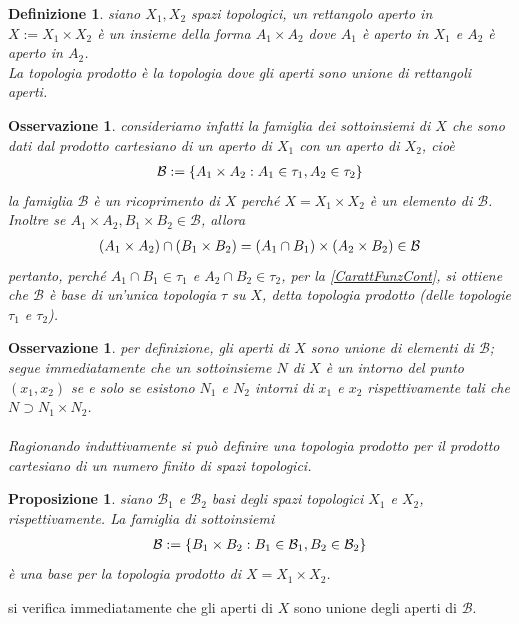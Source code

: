 \documentclass[oneside, 11pt]{amsbook}
\makeatletter
\newcommand{\0}{{(0)}}
\newcommand{\3}{{(3)}}
\theoremstyle{colonplain}
\newtheorem{prop}[thm]{Proposizione}
\theoremstyle{colondefinition}
\newtheorem{defn}[thm]{Definizione}
\theoremstyle{colonremark}
\newtheorem{rmk}[thm]{Osservazione}
\numberwithin{equation}{chapter}
\renewcommand{\proofname}{Dimostrazione}
\renewenvironment{proof}[1][\proofname]{\par
  \pushQED{\qed}%
  \normalfont \topsep6\p@\@plus6\p@\relax
  \trivlist
  \item[\hskip\labelsep\bfseries #1:]\ignorespaces
}{%
  \popQED\endtrivlist\@endpefalse
}
\makeatother
\begin{document}
\begin{defn}
siano $X_1, X_2$ spazi topologici, un rettangolo aperto in $X := X_1 \times X_2$ è un insieme della forma $A_1 \times A_2$ dove $A_1$ è aperto in $X_1$ e $A_2$ è aperto in $A_2$. \\
La \textit{topologia prodotto} è la topologia dove gli aperti sono unione di rettangoli aperti.
\end{defn}
\begin{rmk}
consideriamo infatti la famiglia dei sottoinsiemi di $X$ che sono dati dal prodotto cartesiano di un aperto di $X_1$ con un aperto di $X_2$, cioè
\begin{align}
    \mathcal{B} := \{ A_1 \times A_2 : A_1 \in \tau_1, A_2 \in \tau_2 \} \notag
\end{align}
la famiglia $\mathcal{B}$ è un ricoprimento di $X$ perché $X = X_1 \times X_2$ è un elemento di $\mathcal{B}$. Inoltre se $A_1 \times A_2, B_1 \times B_2 \in \mathcal{B}$, allora
\begin{align}
    (A_1 \times A_2) \cap (B_1 \times B_2) = (A_1 \cap B_1) \times (A_2 \times B_2) \in \mathcal{B} \notag
\end{align}
pertanto, perché $A_1 \cap B_1 \in \tau_1$ e $A_2 \cap B_2 \in \tau_2$, per la \cref{CarattFunzCont}, si ottiene che $\mathcal{B}$ è base di un'unica topologia $\tau$ su $X$, detta \textit{topologia prodotto} (delle topologie $\tau_1$ e $\tau_2$).
\end{rmk}
\begin{rmk}
per definizione, gli aperti di $X$ sono unione di elementi di $\mathcal{B}$; segue immediatamente che un sottoinsieme $N$ di $X$ è un intorno del punto $(x_1, x_2)$ se e solo se esistono $N_1$ e $N_2$ intorni di $x_1$ e $x_2$ rispettivamente tali che $N \supset N_1 \times N_2$. \\ \\
Ragionando induttivamente si può definire una topologia prodotto per il prodotto cartesiano di un numero finito di spazi topologici.
\end{rmk}
\begin{prop}
siano $\mathcal{B}_1$ e $\mathcal{B}_2$ basi degli spazi topologici $X_1$ e $X_2$, rispettivamente. La famiglia di sottoinsiemi
\begin{align}
    \mathcal{B} := \{ B_1 \times B_2 : B_1 \in \mathcal{B}_1, B_2 \in \mathcal{B}_2 \} \notag
\end{align}
è una base per la topologia prodotto di $X = X_1 \times X_2$.
\end{prop}
\begin{proof}
si verifica immediatamente che gli aperti di $X$ sono unione degli aperti di $\mathcal{B}$.
\end{proof}
\end{document}
